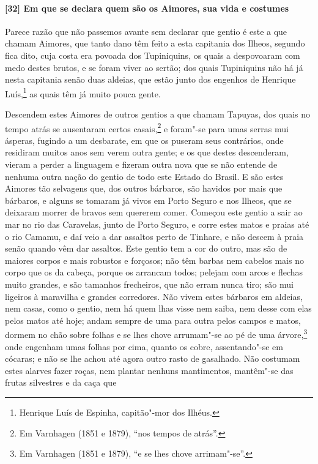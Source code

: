 \paragraph{[32] Em que se declara quem são os Aimores, sua vida e costumes} \quad
Parece razão que não passemos avante sem declarar que gentio é este a que chamam Aimores,
que tanto dano têm feito a esta capitania dos Ilheos, segundo fica dito, cuja costa era
povoada dos Tupiniquins, os quais a despovoaram com medo destes brutos, e se foram viver
ao sertão; dos quais Tupiniquins não há já nesta capitania senão duas aldeias, que estão
junto dos engenhos de Henrique Luís,\footnote{ Henrique Luís de Espinha, capitão"-mor dos
Ilhéus.} as quais têm já muito pouca gente.

Descendem estes Aimores de outros gentios a que chamam Tapuyas, dos quais no tempo atrás
se ausentaram certos casais,\footnote{ Em Varnhagen (1851 e 1879), ``nos tempos de
atrás''.} e foram"-se para umas serras mui ásperas, fugindo a um desbarate, em que os
puseram seus contrários, onde residiram muitos anos sem verem outra gente; e os que destes
descenderam, vieram a perder a linguagem e fizeram outra nova que se não entende de
nenhuma outra nação do gentio de todo este Estado do Brasil. E são estes Aimores tão
selvagens que, dos outros bárbaros, são havidos por mais que bárbaros, e alguns se tomaram
já vivos em Porto Seguro e nos Ilheos, que se deixaram morrer de bravos sem quererem
comer. Começou este gentio a sair ao mar no rio das Caravelas, junto de Porto Seguro, e
corre estes matos e praias até o rio Camamu, e daí veio a dar assaltos perto de Tinhare, e
não descem à praia senão quando vêm dar assaltos. Este gentio tem a cor do outro, mas são
de maiores corpos e mais robustos e forçosos; não têm barbas nem cabelos mais no corpo que
os da cabeça, porque os arrancam todos; pelejam com arcos e flechas muito grandes, e são
tamanhos frecheiros, que não erram nunca tiro; são mui ligeiros à maravilha e grandes
corredores. Não vivem estes bárbaros em aldeias, nem casas, como o gentio, nem há quem
lhas visse nem saiba, nem desse com elas pelos matos até hoje; andam sempre de uma para
outra pelos campos e matos, dormem no chão sobre folhas e se lhes chove arrumam"-se ao pé
de uma árvore,\footnote{ Em Varnhagen (1851 e 1879), ``e se lhes chove arrimam"-se''.} onde
engenham umas folhas por cima, quanto os cobre, assentando"-se em cócaras; e não se lhe
achou até agora outro rasto de gasalhado. Não costumam estes alarves fazer roças, nem
plantar nenhuns mantimentos, mantêm"-se das frutas silvestres e da caça que
